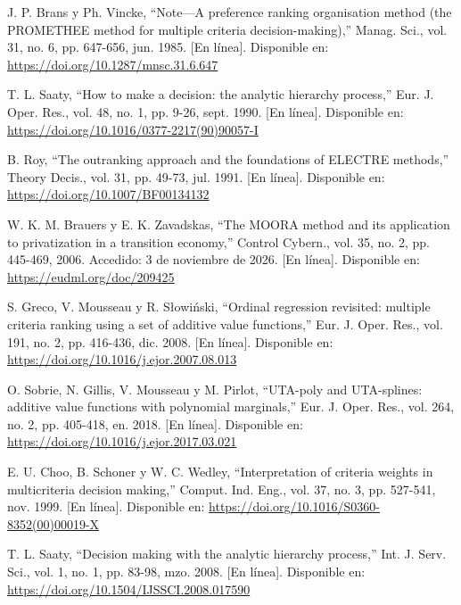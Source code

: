 \documentclass[12pt,a4paper]{article}
\newenvironment{reflist}{%
  \small\sloppy
  \begin{list}{}{%
    \setlength{\leftmargin}{1cm}%
    \setlength{\itemindent}{-1cm}%
    \setlength{\itemsep}{8pt}%
    \setlength{\parsep}{0pt}%
    \setlength{\listparindent}{0pt}%
  }%
}{\end{list}}
\begin{document}
\begin{reflist}
\item[] [16] J. P. Brans y Ph. Vincke, ``Note—A preference ranking organisation method (the PROMETHEE method for multiple criteria decision-making),'' Manag. Sci., vol. 31, no. 6, pp. 647-656, jun. 1985. [En línea]. Disponible en: \url{https://doi.org/10.1287/mnsc.31.6.647}

\item[] [17] T. L. Saaty, ``How to make a decision: the analytic hierarchy process,'' Eur. J. Oper. Res., vol. 48, no. 1, pp. 9-26, sept. 1990. [En línea]. Disponible en: \url{https://doi.org/10.1016/0377-2217(90)90057-I}

\item[] [18] B. Roy, ``The outranking approach and the foundations of ELECTRE methods,'' Theory Decis., vol. 31, pp. 49-73, jul. 1991. [En línea]. Disponible en: \url{https://doi.org/10.1007/BF00134132}

\item[] [19] W. K. M. Brauers y E. K. Zavadskas, ``The MOORA method and its application to privatization in a transition economy,'' Control Cybern., vol. 35, no. 2, pp. 445-469, 2006. Accedido: 3 de noviembre de 2026. [En línea]. Disponible en: \url{https://eudml.org/doc/209425}

\item[] [20] S. Greco, V. Mousseau y R. Słowiński, ``Ordinal regression revisited: multiple criteria ranking using a set of additive value functions,'' Eur. J. Oper. Res., vol. 191, no. 2, pp. 416-436, dic. 2008. [En línea]. Disponible en: \url{https://doi.org/10.1016/j.ejor.2007.08.013}

\item[] [21] O. Sobrie, N. Gillis, V. Mousseau y M. Pirlot, ``UTA-poly and UTA-splines: additive value functions with polynomial marginals,'' Eur. J. Oper. Res., vol. 264, no. 2, pp. 405-418, en. 2018. [En línea]. Disponible en: \url{https://doi.org/10.1016/j.ejor.2017.03.021}

\item[] [22] E. U. Choo, B. Schoner y W. C. Wedley, ``Interpretation of criteria weights in multicriteria decision making,'' Comput. Ind. Eng., vol. 37, no. 3, pp. 527-541, nov. 1999. [En línea]. Disponible en: \url{https://doi.org/10.1016/S0360-8352(00)00019-X}

\item[] [23] T. L. Saaty, ``Decision making with the analytic hierarchy process,'' Int. J. Serv. Sci., vol. 1, no. 1, pp. 83-98, mzo. 2008. [En línea]. Disponible en: \url{https://doi.org/10.1504/IJSSCI.2008.017590}


\end{reflist}
\end{document}
